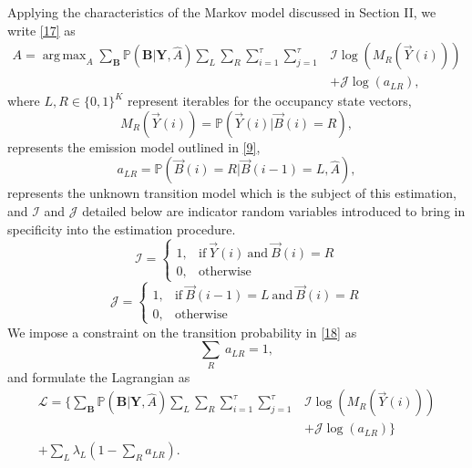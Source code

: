 \documentclass[10pt,twocolumn]{IEEEtran}
\DeclareMathOperator*{\argmax}{arg\,max}
\begin{document}
Applying the characteristics of the Markov model discussed in Section II, we write \eqref{17} as
\begin{equation}\label{18}
    \begin{aligned}
        A=\argmax_{A}\sum_{\textbf{B}}\mathbb{P}(\textbf{B}|\textbf{Y},\hat{A})\sum_{L}\sum_{R}\sum_{i=1}^{\tau}\sum_{j=1}^{\tau}&\mathcal{I}\log(M_R(\vec{Y}(i)))\\
        &+\mathcal{J}\log(a_{LR}),
    \end{aligned}
\end{equation}
where $L,R \in \{0,1\}^K$ represent iterables for the occupancy state vectors,
\begin{equation}\label{19}
    M_R(\vec{Y}(i)) = \mathbb{P}(\vec{Y}(i)|\vec{B}(i)=R),
\end{equation}
represents the emission model outlined in \eqref{9},
\begin{equation}\label{20}
    a_{LR} = \mathbb{P}(\vec{B}(i)=R|\vec{B}(i-1)=L, \hat{A}),
\end{equation}
represents the unknown transition model which is the subject of this estimation, and $\mathcal{I}$ and $\mathcal{J}$ detailed below are indicator random variables introduced to bring in specificity into the estimation procedure.
\begin{equation}\label{21}
    \mathcal{I} = 
    \begin{cases}
        1, &\text{if}\ \vec{Y}(i)\ \text{and}\ \vec{B}(i)=R\\
        0, &\text{otherwise}
    \end{cases}
\end{equation}
\begin{equation}\label{22}
    \mathcal{J} = 
    \begin{cases}
        1, &\text{if}\ \vec{B}(i-1)=L\ \text{and}\ \vec{B}(i)=R\\
        0, &\text{otherwise}
    \end{cases}
\end{equation}
We impose a constraint on the transition probability in \eqref{18} as 
\begin{equation}\label{23}
    \sum_{R}\ a_{LR} = 1,    
\end{equation}
and formulate the Lagrangian as
\begin{equation}\label{24}
    \begin{aligned}
        \mathcal{L}=\Big\{\sum_{\textbf{B}}\mathbb{P}(\textbf{B}|\textbf{Y},\hat{A})\sum_{L}\sum_{R}\sum_{i=1}^{\tau}\sum_{j=1}^{\tau}&\mathcal{I}\log(M_R(\vec{Y}(i)))\\
        &+\mathcal{J}\log(a_{LR})\Big\}\\
        +\sum_{L}\lambda_L(1-\sum_Ra_{LR}).
    \end{aligned}
\end{equation}
\end{document}
